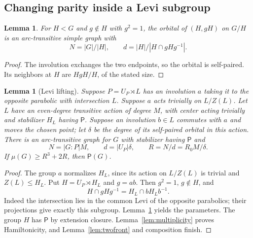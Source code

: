 \documentclass[11pt]{article}
\newtheorem{lemma}[theorem]{Lemma}
\theoremstyle{definition}
\newcommand{\Pp}{\mathsf P}
\begin{document}
\subsection{Changing parity inside a Levi subgroup}
\begin{lemma}\label{lem:orbital}
For $H<G$ and $g\notin H$ with $g^2=1$, the orbital of $(H,gH)$ on $G/H$ is an arc-transitive simple graph with
\[
N=|G|/|H|,\qquad d=|H|/|H\cap gHg^{-1}|.
\]
\end{lemma}
\begin{proof}
The involution exchanges the two endpoints, so the orbital is self-paired. Its neighbors at $H$ are $HgH/H$, of the stated size.
\end{proof}
\begin{lemma}[Levi lifting]\label{lem:levilift}
Suppose $P=U_P\rtimes L$ has an involution $a$ taking it to the opposite parabolic with intersection $L$. Suppose $a$ acts trivially on $L/Z(L)$. Let $L$ have an even-degree transitive action of degree $M$, with center acting trivially and stabilizer $H_L$ having $\Pp$. Suppose an involution $b\in L$ commutes with $a$ and moves the chosen point; let $\delta$ be the degree of its self-paired orbital in this action. There is an arc-transitive graph for $G$ with stabilizer having $\Pp$ and
\[
N=|G:P|M,\qquad d=|U_P|\delta,\qquad R=N/d=R_0M/\delta.
\]
If $\mu(G)\ge R^3+2R$, then $\Pp(G)$.
\end{lemma}
\begin{proof}
The group $a$ normalizes $H_L$, since its action on $L/Z(L)$ is trivial and $Z(L)\le H_L$. Put $H=U_P\rtimes H_L$ and $g=ab$. Then $g^2=1$, $g\notin H$, and
\[
H\cap gHg^{-1}=H_L\cap bH_Lb^{-1}.
\]
Indeed the intersection lies in the common Levi of the opposite parabolics; their projections give exactly this subgroup. Lemma~\ref{lem:orbital} yields the parameters. The group $H$ has $\Pp$ by extension closure. Lemma~\ref{lem:multiplicity} proves Hamiltonicity, and Lemma~\ref{lem:twofront} and composition finish.
\end{proof}
\end{document}

